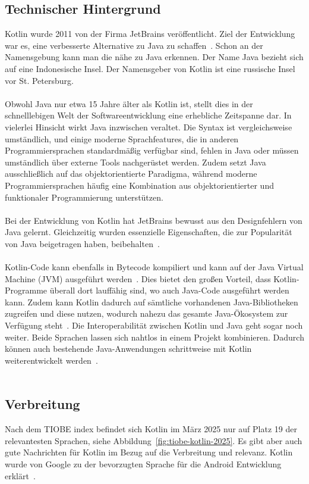 \documentclass[11pt]{article}
\begin{document}
    \subsection{Technischer Hintergrund}
    Kotlin wurde 2011 von der Firma JetBrains veröffentlicht.
    Ziel der Entwicklung war es, eine verbesserte Alternative zu Java zu schaffen~\cite[19]{kotlin-handbuch}.
    Schon an der Namensgebung kann man die nähe zu Java erkennen.
    Der Name Java bezieht sich auf eine Indonesische Insel.
    Der Namensgeber von Kotlin ist eine russische Insel vor St. Petersburg.\\
    \\
    Obwohl Java nur etwa 15 Jahre älter als Kotlin ist, stellt dies in der schnelllebigen Welt der Softwareentwicklung eine erhebliche Zeitspanne dar.
    In vielerlei Hinsicht wirkt Java inzwischen veraltet.
    Die Syntax ist vergleichsweise umständlich, und einige moderne Sprachfeatures, die in anderen Programmiersprachen standardmäßig verfügbar sind, fehlen in Java oder müssen umständlich über externe Tools nachgerüstet werden.
    Zudem setzt Java ausschließlich auf das objektorientierte Paradigma, während moderne Programmiersprachen häufig eine Kombination aus objektorientierter und funktionaler Programmierung unterstützen.\\
    \\
    Bei der Entwicklung von Kotlin hat JetBrains bewusst aus den Designfehlern von Java gelernt.
    Gleichzeitig wurden essenzielle Eigenschaften, die zur Popularität von Java beigetragen haben, beibehalten~\cite[20]{kotlin-handbuch}.\\
    \\
    Kotlin-Code kann ebenfalls in Bytecode kompiliert und kann auf der Java Virtual Machine (JVM) ausgeführt werden~\cite{kotlin-compile}.
    Dies bietet den großen Vorteil, dass Kotlin-Programme überall dort lauffähig sind, wo auch Java-Code ausgeführt werden kann.
    Zudem kann Kotlin dadurch auf sämtliche vorhandenen Java-Bibliotheken zugreifen und diese nutzen, wodurch nahezu das gesamte Java-Ökosystem zur Verfügung steht~\cite[20]{kotlin-handbuch}.
    Die Interoperabilität zwischen Kotlin und Java geht sogar noch weiter.
    Beide Sprachen lassen sich nahtlos in einem Projekt kombinieren.
    Dadurch können auch bestehende Java-Anwendungen schrittweise mit Kotlin weiterentwickelt werden~\cite[19-20]{kotlin-handbuch}.\\
    \\
    \subsection{Verbreitung}
    Nach dem TIOBE index befindet sich Kotlin im März 2025 nur auf Platz 19 der relevantesten Sprachen, siehe Abbildung~\ref{fig:tiobe-kotlin-2025}.
    Es gibt aber auch gute Nachrichten für Kotlin im Bezug auf die Verbreitung und relevanz.
    Kotlin wurde von Google zu der bevorzugten Sprache für die Android Entwicklung erklärt~\cite{tn3-google}.\\
    \\
\end{document}
